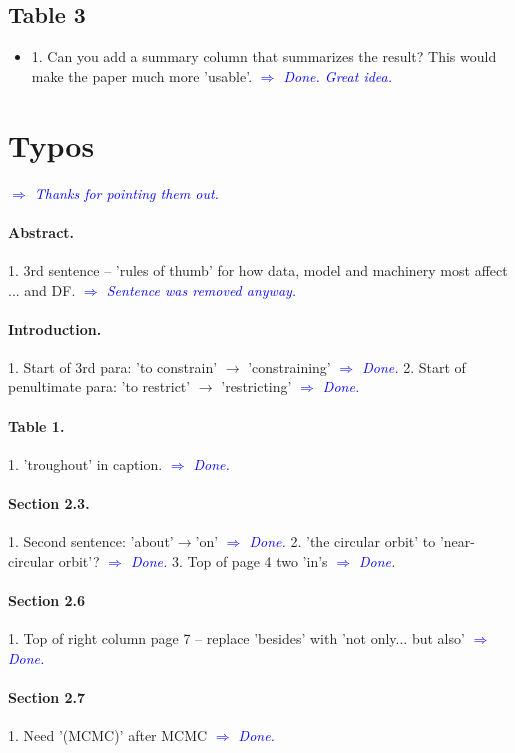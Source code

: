 \documentclass[10pt,a4paper]{article}
\newcommand{\Comment}[1]{\textsl{\textcolor{Blue}{$\Longrightarrow$ {#1}}}}
\begin{document}
\subsection{Table 3}
\begin{itemize}
\item 1. Can you add a summary column that summarizes the result? This would make the paper much more 'usable'. \Comment{Done. Great idea.}
\end{itemize}


\section{Typos}

 \Comment{Thanks for pointing them out.}

\paragraph{Abstract.} 1. 3rd sentence -- 'rules of thumb' for how data, model and machinery most affect ... and DF. \Comment{Sentence was removed anyway.}

\paragraph{Introduction.} 1. Start of 3rd para: 'to constrain' $\rightarrow$ 'constraining'  \Comment{Done.} 2. Start of penultimate para: 'to restrict' $\rightarrow$ 'restricting' \Comment{Done.}

\paragraph{Table 1.} 1. 'troughout' in caption. \Comment{Done.}

\paragraph{Section 2.3.} 1. Second sentence: 'about'$\rightarrow$'on' \Comment{Done.} 2. 'the circular orbit' to 'near-circular orbit'? \Comment{Done.} 3. Top of page 4 two 'in's \Comment{Done.}

\paragraph{Section 2.6} 1. Top of right column page 7 -- replace 'besides' with 'not only... but also' \Comment{Done.}

\paragraph{Section 2.7} 1. Need '(MCMC)' after MCMC \Comment{Done.}
\end{document}

